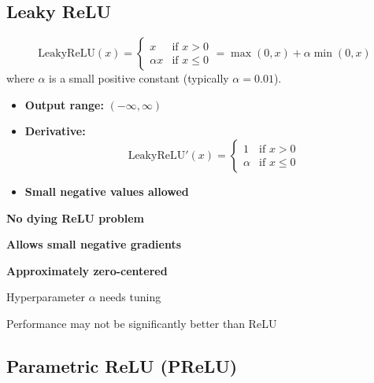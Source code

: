\subsection{Leaky ReLU}

\begin{equation}
\text{LeakyReLU}(x) = 
\begin{cases}
x & \text{if } x > 0 \\
\alpha x & \text{if } x \leq 0
\end{cases}
= \max(0, x) + \alpha \min(0, x)
\end{equation}
where $\alpha$ is a small positive constant (typically $\alpha = 0.01$).

\begin{properties}
\begin{itemize}
    \item \textbf{Output range:} $(-\infty, \infty)$
    \item \textbf{Derivative:} 
    \begin{equation}
    \text{LeakyReLU}'(x) = 
    \begin{cases}
    1 & \text{if } x > 0 \\
    \alpha & \text{if } x \leq 0
    \end{cases}
    \end{equation}
    \item \textbf{Small negative values allowed}
\end{itemize}
\end{properties}

\begin{advantages}
    \item \textbf{No dying ReLU problem}
    \item \textbf{Allows small negative gradients}
    \item \textbf{Approximately zero-centered}
\end{advantages}

\begin{disadvantages}
    \item Hyperparameter $\alpha$ needs tuning
    \item Performance may not be significantly better than ReLU
\end{disadvantages}

\subsection{Parametric ReLU (PReLU)}

